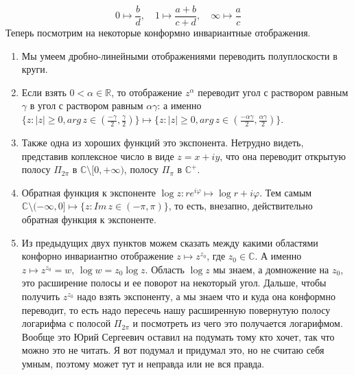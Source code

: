 \documentclass[12pt,a4paper]{article} %
\newcommand{\R}{\mathbb{R}}
\newcommand{\Co}{\mathbb{C}}
\begin{document}
	$$0\mapsto\frac{b}{d},\quad 1\mapsto\frac{a+b}{c+d},\quad \infty\mapsto\frac{a}{c}$$
	Теперь посмотрим на некоторые конформно инвариантные отображения.
	\begin{enumerate}
		\item Мы умеем дробно-линейными отображениями переводить полуплоскости в круги.
		\item Если взять $0<\alpha\in\R$, то отображение $z^{\alpha}$ переводит угол с раствором равным $\gamma$ в угол с раствором равным $\alpha\gamma$: а именно\\ $\{z:|z|\geq0, arg\,z\in(\frac{-\gamma}{2},\frac{\gamma}{2})\}\mapsto\{z:|z|\geq0, arg\,z\in(\frac{-\alpha\gamma}{2},\frac{\alpha\gamma}{2})\}$.
		\item Также одна из хороших функций это экспонента. Нетрудно видеть, представив коплексное число в виде $z=x+iy$, что она переводит открытую полосу $\Pi_{2\pi}$ в $\Co\setminus[0,+\infty)$, полосу $\Pi_{\pi}$ в $\Co^{+}$.
		\item Обратная функция к экспоненте $\log z:re^{i\varphi}\mapsto\log r+i\varphi$. Тем самым\\ $\Co\setminus(-\infty,0]\mapsto\{z:Im\,z\in(-\pi,\pi)\}$, то есть, внезапно, действительно обратная функция к экспоненте.
		\item Из предыдущих двух пунктов можем сказать между какими областями конфорно инвариантно отображение $z\mapsto z^{z_0}$, где $z_0\in\Co$. А именно $z\mapsto z^{z_0}=w,\,\log w=z_0\log z$. Область $\log z$ мы знаем, а домножение на $z_0$, это расширение полосы и ее поворот на некоторый угол. Дальше, чтобы получить $z^{z_0}$ надо взять экспоненту, а мы знаем что и куда она конформно переводит, то есть надо пересечь нашу расширенную повернутую полосу логарифма с полосой $\Pi_{2\pi}$ и посмотреть из чего это получается логарифмом. Вообще это Юрий Сергеевич оставил на подумать тому кто хочет, так что можно это не читать. Я вот подумал и придумал это, но не считаю себя умным, поэтому может тут и неправда или не вся правда.

\end{enumerate}
\end{document}
